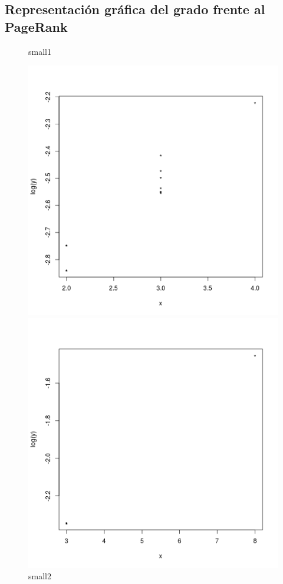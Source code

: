 \documentclass[palatino]{apuntes}
\begin{document}
\newpage
\subsection{Representación gráfica del grado frente al PageRank }


\begin{figure}[h!] 
\centering 
\begin{minipage}[b]{0.4\textwidth}
	\caption{small1}
	\includegraphics[scale=0.45]{img/small1_grado-pr}
\end{minipage}
\hfill
\begin{minipage}[b]{0.4\textwidth}
	\caption{small2}
	\includegraphics[scale=0.45]{img/small2_grado-pr}
\end{minipage}
\end{figure} 
\end{document}
